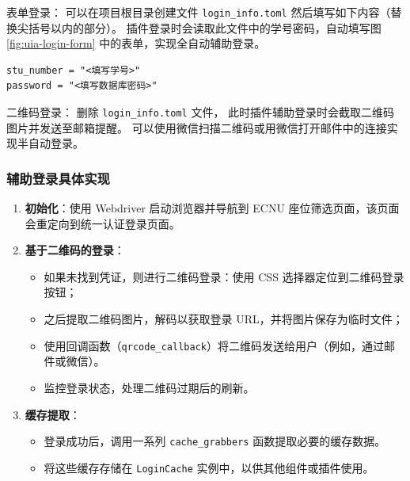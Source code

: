 \documentclass[14pt,a4paper,UTF8,twoside]{article}
\begin{document}
    \begin{rmr}[切换表单登录和二维码登录]
        \quad 表单登录：
        可以在项目根目录创建文件 \verb`login_info.toml`
        然后填写如下内容（替换尖括号以内的部分）。
        插件登录时会读取此文件中的学号密码，自动填写图\ref{fig:uia-login-form} 中的表单，实现全自动辅助登录。
        \begin{verbatim}
stu_number = "<填写学号>"
password = "<填写数据库密码>" \end{verbatim}

        \quad 二维码登录：
        删除 \verb`login_info.toml` 文件，
        此时插件辅助登录时会截取二维码图片并发送至邮箱提醒。
        可以使用微信扫描二维码或用微信打开邮件中的连接实现半自动登录。
    \end{rmr}

    \subsubsection{辅助登录具体实现}
    \begin{enumerate}
        \item \textbf{初始化}：使用 Webdriver 启动浏览器并导航到 ECNU 座位筛选页面，该页面会重定向到统一认证登录页面。

        \item \textbf{基于二维码的登录}：
        \begin{itemize}
            \item 如果未找到凭证，则进行二维码登录：使用 CSS 选择器定位到二维码登录按钮；
            \item 之后提取二维码图片，解码以获取登录 URL，并将图片保存为临时文件；
            \item 使用回调函数（\texttt{qrcode\_callback}）将二维码发送给用户（例如，通过邮件或微信）。
            \item 监控登录状态，处理二维码过期后的刷新。
        \end{itemize}

        \item \textbf{缓存提取}：
        \begin{itemize}
            \item 登录成功后，调用一系列 \texttt{cache\_grabbers} 函数提取必要的缓存数据。
            \item 将这些缓存存储在 \texttt{LoginCache} 实例中，以供其他组件或插件使用。
        \end{itemize}
    \end{enumerate}
\end{document}
